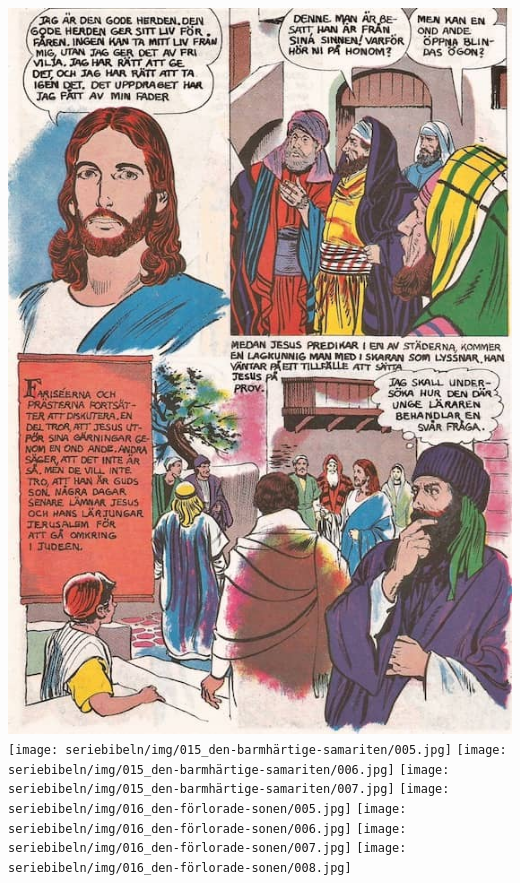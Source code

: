 \includegraphics[width=\textwidth]{seriebibeln/img/014_den-blinde-mannen/007.jpg}
\texttt{[image: seriebibeln/img/015\_den-barmhärtige-samariten/005.jpg]}
\texttt{[image: seriebibeln/img/015\_den-barmhärtige-samariten/006.jpg]}
\texttt{[image: seriebibeln/img/015\_den-barmhärtige-samariten/007.jpg]}
\texttt{[image: seriebibeln/img/016\_den-förlorade-sonen/005.jpg]}
\texttt{[image: seriebibeln/img/016\_den-förlorade-sonen/006.jpg]}
\texttt{[image: seriebibeln/img/016\_den-förlorade-sonen/007.jpg]}
\texttt{[image: seriebibeln/img/016\_den-förlorade-sonen/008.jpg]}

